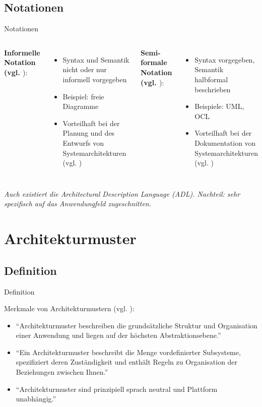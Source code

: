 \documentclass{beamer}
\begin{document}
			\subsection{Notationen}
			\begin{frame}{Notationen}
			\begin{columns}
			\textbf{Informelle Notation (vgl. \cite[ S. 8]{req}}):
				\begin{itemize}
					\item Syntax und Semantik nicht oder nur informell vorgegeben
					\item Beispiel: freie Diagramme
					\item Vorteilhaft bei der Planung und des Entwurfs von Systemarchitekturen (vgl. \cite[ S. 191]{sommer})
				\end{itemize}				
				\textbf{Semi-formale Notation (vgl. \cite[ S. 8]{req}}):
				\begin{itemize}
					\item Syntax vorgegeben, Semantik halbformal beschrieben
					\item Beispiele: UML, OCL
					\item Vorteilhaft bei der Dokumentation von Systemarchitekturen (vgl. \cite[ S. 191]{sommer})
				\end{itemize}
			\end{columns}
			\textit{Auch existiert die Architectural Description Language (ADL). Nachteil: sehr spezifisch auf das Anwendungfeld zugeschnitten.}
			\end{frame}
		
		\section{Architekturmuster}
			\subsection{Definition}
			\begin{frame}{Definition}
				\begin{block}{Merkmale von Architekturmustern (vgl. \cite{wulff}):}
					\begin{itemize}
						\item \enquote{Architekturmuster beschreiben die grundsätzliche 
						Struktur und Organisation einer Anwendung und 
						liegen auf der höchsten Abstraktionsebene.}
					
						\item \enquote{Ein Architekturmuster beschreibt die Menge 
						vordefinierter Subsysteme, spezifiziert deren 
						Zuständigkeit und enthält Regeln zu Organisation 
						der Beziehungen zwischen Ihnen.}
					
						\item \enquote{Architekturmuster sind prinzipiell 
						sprach neutral
						und Plattform unabhängig.}
					\end{itemize}
				\end{block}
			\end{frame}
\end{document}
